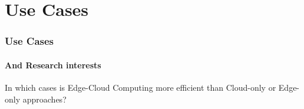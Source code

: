 \documentclass[utf8,xcolor=table, page number]{earlywinter}
\begin{document}
% 


\section{Use Cases}

\begin{frame}
  \frametitle{Use Cases}
  \framesubtitle{And Research interests}

  \begin{block}{}
    In which cases is Edge-Cloud Computing more efficient than Cloud-only or Edge-only approaches?
  \end{block}

\end{frame}
\end{document}
